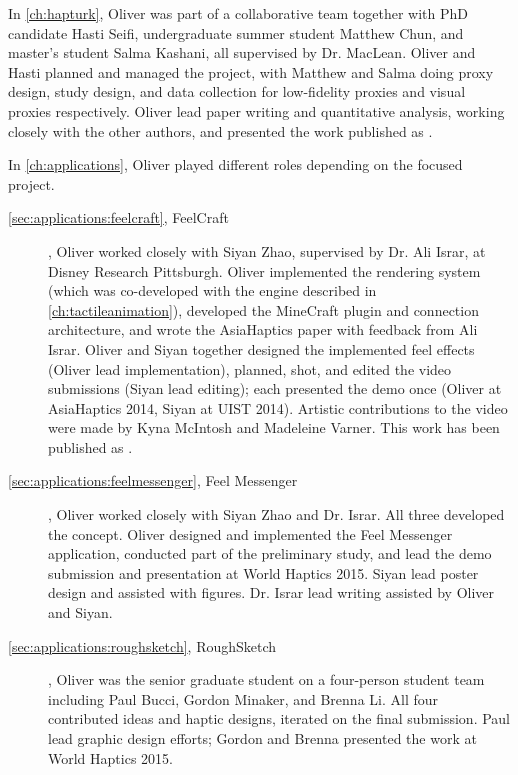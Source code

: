 In \autoref{ch:hapturk}, Oliver was part of a collaborative team together with PhD candidate Hasti Seifi, undergraduate summer student Matthew Chun, and master's student Salma Kashani, all supervised by Dr. MacLean.
Oliver and Hasti planned and managed the project, with Matthew and Salma doing proxy design, study design, and data collection for low-fidelity proxies and visual proxies respectively.
Oliver lead paper writing and quantitative analysis, working closely with the other authors, and presented the work published as \citet{Schneider2016hapturk}.

In \autoref{ch:applications}, Oliver played different roles depending on the focused project.
\begin{description}

\item[\autoref{sec:applications:feelcraft}, FeelCraft], Oliver worked closely with Siyan Zhao, supervised by Dr. Ali Israr, at Disney Research Pittsburgh.
Oliver implemented the rendering system (which was co-developed with the engine described in \autoref{ch:tactileanimation}), developed the MineCraft plugin and connection architecture, and wrote the AsiaHaptics paper with feedback from Ali Israr.
Oliver and Siyan together designed the implemented feel effects (Oliver lead implementation), planned, shot, and edited the video submissions (Siyan lead editing); each presented the demo once (Oliver at AsiaHaptics 2014, Siyan at UIST 2014).
Artistic contributions to the video were made by Kyna McIntosh and Madeleine Varner.
This work has been published as \citet{SchneiderAsiaHaptics2014}.

\item[\autoref{sec:applications:feelmessenger}, Feel Messenger], Oliver worked closely with Siyan Zhao and Dr. Israr.
All three developed the concept.
Oliver designed and implemented the Feel Messenger application, conducted part of the preliminary study, and lead the demo submission and presentation at World Haptics 2015.
Siyan lead poster design and assisted with figures.
Dr. Israr lead writing assisted by Oliver and Siyan.


\item[\autoref{sec:applications:roughsketch}, RoughSketch], Oliver was the senior graduate student on a four-person student team including Paul Bucci, Gordon Minaker, and Brenna Li.
All four contributed ideas and haptic designs, iterated on the final submission.
Paul lead graphic design efforts; Gordon and Brenna presented the work at World Haptics 2015.


\end{description}
